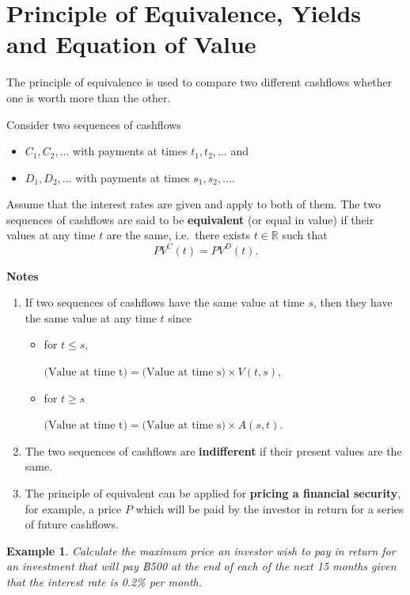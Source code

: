 \documentclass[
]{book}
\theoremstyle{definition}
\theoremstyle{definition}
\newtheorem{example}{Example}[chapter]
\theoremstyle{definition}
\theoremstyle{definition}
\theoremstyle{remark}
\begin{document}
\section{Principle of Equivalence, Yields and Equation of Value}\label{principle-of-equivalence-yields-and-equation-of-value}

The principle of equivalence is used to compare two different cashflows
whether one is worth more than the other.

Consider two sequences of cashflows

\begin{itemize}
\item
  \(C_1, C_2, \ldots\) with payments at times \(t_1, t_2, \ldots\) and
\item
  \(D_1, D_2, \ldots\) with payments at times \(s_1, s_2, \ldots\).
\end{itemize}

Assume that the interest rates are given and apply to both of them. The
two sequences of cashflows are said to be \textbf{equivalent} (or equal in
value) if their values at any time \(t\) are the same, i.e.~there exists
\(t \in \mathbb{R}\) such that \[PV^C(t)  = PV^D(t).\]

\textbf{Notes}

\begin{enumerate}
\def\labelenumi{\arabic{enumi}.}
\item
  If two sequences of cashflows have the same value at time \(s\), then
  they have the same value at any time \(t\) since

  \begin{itemize}
  \item
    for \(t \le s\),

    \(\text{(Value at time t)} = \text{(Value at time s)} \times V(t,s),\)
  \item
    for \(t \ge s\)

    \(\text{(Value at time t)} = \text{(Value at time s)} \times A(s,t).\)
  \end{itemize}
\item
  The two sequences of cashflows are \textbf{indifferent} if their present
  values are the same.
\item
  The principle of equivalent can be applied for \textbf{pricing a financial
  security}, for example, a price \(P\) which will be paid by the
  investor in return for a series of future cashflows.
\end{enumerate}

\begin{example}
\emph{Calculate the maximum price an investor wish to pay in return for an
investment that will pay ฿500 at the end of each of the next 15 months
given that the interest rate is 0.2\% per month.}
\end{example}
\end{document}
